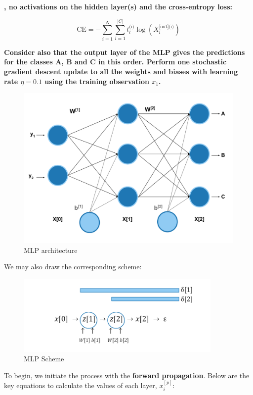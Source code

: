 \documentclass[12pt]{article}
\begin{document}
\begin{enumerate}
\textbf{, no activations on the hidden layer(s) and the cross-entropy loss:}

\begin{equation}\label{eq:CE}
    \text{CE} = -\sum_{i=1}^{N}\sum_{l=1}^{|C|} t_{l}^{\text{(i)}} \log(X_{l}^{\text{[out](i)}})
\end{equation}

\textbf{Consider also that the output layer of the MLP gives the predictions for the classes A, B and C in this order. Perform one
stochastic gradient descent update to all the weights and biases with learning rate $\eta = 0.1$
using the training observation $x_1$.}

\begin{figure}[H]
    \centering
    \includegraphics[width=12cm]{./Part I/MLP_corrected.pdf}
    \caption{MLP architecture}
\end{figure}

\vspace{10pt}
We may also draw the corresponding scheme:
\begin{figure}[H]
    \centering
    \includegraphics[width=10cm]{./Part I/Scheme.png}
    \caption{MLP Scheme}
\end{figure}

To begin, we initiate the process with the \textbf{forward propagation}. Below are the key equations to calculate the values of each
layer, $x^{[p]}_i$:


\end{enumerate}
\end{document}
